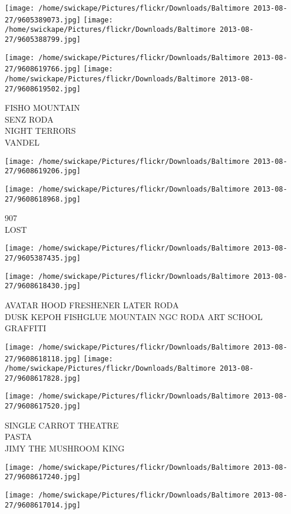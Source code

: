 \documentclass[10pt,letterpaper]{article}
\begin{document}
\texttt{[image: /home/swickape/Pictures/flickr/Downloads/Baltimore 2013-08-27/9605389073.jpg]}
\texttt{[image: /home/swickape/Pictures/flickr/Downloads/Baltimore 2013-08-27/9605388799.jpg]}

\texttt{[image: /home/swickape/Pictures/flickr/Downloads/Baltimore 2013-08-27/9608619766.jpg]}
\texttt{[image: /home/swickape/Pictures/flickr/Downloads/Baltimore 2013-08-27/9608619502.jpg]}

FISHO MOUNTAIN\\
SENZ RODA\\
NIGHT TERRORS\\
VANDEL
\pagebreak

\texttt{[image: /home/swickape/Pictures/flickr/Downloads/Baltimore 2013-08-27/9608619206.jpg]}

\vspace{0.25in}
\texttt{[image: /home/swickape/Pictures/flickr/Downloads/Baltimore 2013-08-27/9608618968.jpg]}

907\\
LOST
\pagebreak

\texttt{[image: /home/swickape/Pictures/flickr/Downloads/Baltimore 2013-08-27/9605387435.jpg]}

\vspace{0.25in}
\texttt{[image: /home/swickape/Pictures/flickr/Downloads/Baltimore 2013-08-27/9608618430.jpg]}

AVATAR HOOD FRESHENER LATER RODA\\
DUSK KEPOH FISHGLUE MOUNTAIN NGC RODA ART SCHOOL GRAFFITI
\pagebreak

\texttt{[image: /home/swickape/Pictures/flickr/Downloads/Baltimore 2013-08-27/9608618118.jpg]}
\texttt{[image: /home/swickape/Pictures/flickr/Downloads/Baltimore 2013-08-27/9608617828.jpg]}

\texttt{[image: /home/swickape/Pictures/flickr/Downloads/Baltimore 2013-08-27/9608617520.jpg]}

SINGLE CARROT THEATRE\\
PASTA\\
JIMY THE MUSHROOM KING
\pagebreak

\texttt{[image: /home/swickape/Pictures/flickr/Downloads/Baltimore 2013-08-27/9608617240.jpg]}

\vspace{0.25in}
\texttt{[image: /home/swickape/Pictures/flickr/Downloads/Baltimore 2013-08-27/9608617014.jpg]}
\end{document}
